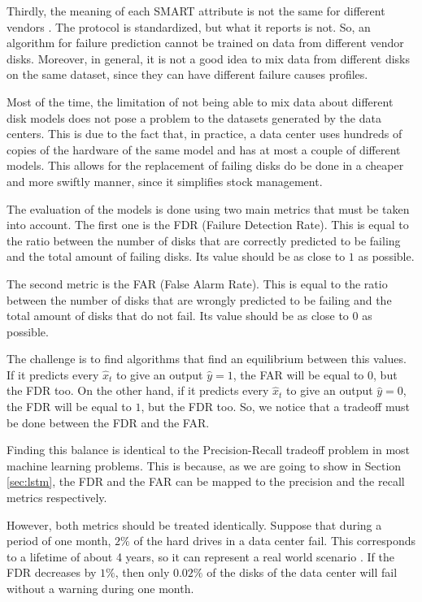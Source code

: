 Thirdly, the meaning of each SMART attribute is not the same for different vendors \cite{SamsungSSD}.
The protocol is standardized, but what it reports is not.
So, an algorithm for failure prediction cannot be trained on data from different vendor disks.
Moreover, in general, it is not a good idea to mix data from different disks on the same dataset, since they can have different failure causes profiles.

Most of the time, the limitation of not being able to mix data about different disk models does not pose a problem to the datasets generated by the data centers.
This is due to the fact that, in practice, a data center uses hundreds of copies of the hardware of the same model and has at most a couple of different models.
This allows for the replacement of failing disks do be done in a cheaper and more swiftly manner, since it simplifies stock management.

The evaluation of the models is done using two main metrics that must be taken into account.
The first one is the FDR (Failure Detection Rate).
This is equal to the ratio between the number of disks that are correctly predicted to be failing and the total amount of failing disks.
Its value should be as close to $1$ as possible.

The second metric is the FAR (False Alarm Rate).
This is equal to the ratio between the number of disks that are wrongly predicted to be failing and the total amount of disks that do not fail.
Its value should be as close to $0$ as possible.

The challenge is to find algorithms that find an equilibrium between this values.
If it predicts every $\hat{x}_t$ to give an output $\hat{y} = 1$, the FAR will be equal to $0$, but the FDR too.
On the other hand, if it predicts every $\hat{x}_t$ to give an output $\hat{y} = 0$, the FDR will be equal to $1$, but the FDR too.
So, we notice that a tradeoff must be done between the FDR and the FAR.

Finding this balance is identical to the Precision-Recall tradeoff problem in most machine learning problems.
This is because, as we are going to show in Section \ref{sec:lstm}, the FDR and the FAR can be mapped to the precision and the recall metrics respectively.

However, both metrics should be treated identically.
Suppose that during a period of one month, $2\%$ of the hard drives in a data center fail.
This corresponds to a lifetime of about 4 years, so it can represent a real world scenario \cite{Vishwanath10}.
If the FDR decreases by $1\%$, then only $0.02\%$ of the disks of the data center will fail without a warning during one month.

